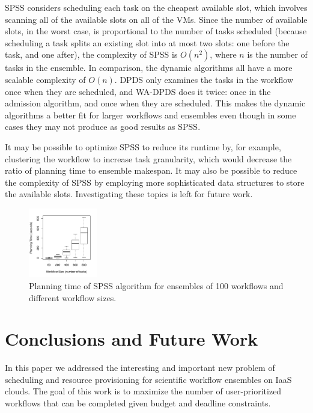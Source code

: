 \documentclass[conference]{IEEEtran}
\begin{document}
SPSS considers scheduling each task on the cheapest available slot, which
involves scanning all of the available slots on all of the VMs. Since the number
of available slots, in the worst case, is proportional to the number of tasks
scheduled (because scheduling a task splits an existing slot into at most two
slots: one before the task, and one after), the complexity of SPSS is
$O(n^2)$, where $n$ is the number of tasks in the ensemble. In comparison, the
dynamic algorithms all have a more scalable complexity of $O(n)$. DPDS only
examines the tasks in the workflow once when they are scheduled, and WA-DPDS
does it twice: once in the admission algorithm, and once when they are
scheduled. This makes the dynamic algorithms a better fit for larger workflows
and ensembles even though in some cases they may not produce as good results
as SPSS.

It may be possible to optimize SPSS to reduce its runtime by, for example,
clustering the workflow to increase task granularity, which would decrease the
ratio of planning time to ensemble makespan. It may also be possible to reduce
the complexity of SPSS by employing more sophisticated data structures to
store the available slots. Investigating these topics is left for future work.


\begin{figure}[tb]
    \centering
    \vspace{-6mm}
    \includegraphics[width=0.27\textwidth]{spss_planning_time}
    \vspace{-3mm}
    \caption{Planning time of SPSS algorithm for ensembles of 100 workflows and different workflow sizes.}
    \label{fig:spss_planning_time}
\end{figure}

\section{Conclusions and Future Work}
\label{sec:conclusions}

In this paper we addressed the interesting and important new problem of
scheduling and resource provisioning for scientific workflow ensembles on IaaS
clouds. The goal of this work is to maximize the number of user-prioritized
workflows that can be completed given budget and deadline constraints.
\end{document}
